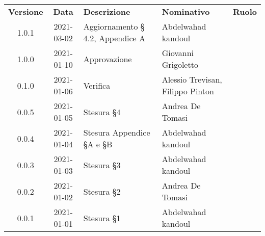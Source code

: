 {
    \renewcommand{\arraystretch}{1.5}
    \centering
    \begin{longtable}{ c c  C{3.5cm}  C{4cm}  c }
        \rowcolor{\primaryColor}
        \textcolor{\secondaryColor}{
        \textbf{Versione}}     & \textcolor{\secondaryColor}{\textbf{Data}}       & \textcolor{\secondaryColor}
        {\textbf{Descrizione}} & \textcolor{\secondaryColor}{\textbf{Nominativo}} & \textcolor{\secondaryColor}{\textbf{Ruolo}}                          \\


        1.0.1                   &2021-03-02                                       & Aggiornamento § 4.2, Appendice A             &Abdelwahad kandoul & \verificatore{}\\
        1.0.0                   &2021-01-10                                       & Approvazione                                 &Giovanni Grigoletto & \responsabile{}\\
        0.1.0                  & 2021-01-06                                       & Verifica                                     & Alessio Trevisan, Filippo Pinton &\verificatore{}\\
        0.0.5                   &2021-01-05                                       & Stesura §4                                   & Andrea De Tomasi & \verificatore{} \\
        0.0.4                  & 2021-01-04                                       & Stesura Appendice §A e §B                    & Abdelwahad kandoul & \verificatore{} \\
        0.0.3                  & 2021-01-03                                       & Stesura §3                                   & Abdelwahad kandoul & \verificatore{} \\
        0.0.2                  & 2021-01-02                                       & Stesura §2                                   & Andrea De Tomasi & \verificatore{} \\
        0.0.1                  & 2021-01-01                                       & Stesura §1                                   & Abdelwahad kandoul & \verificatore{} \\
    
    
    \end{longtable}
}

